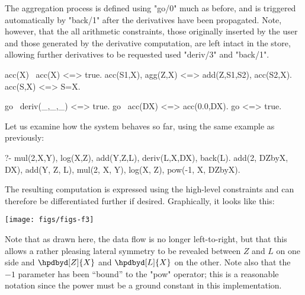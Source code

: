 The aggregation process is defined using "go/0" much as before, and is triggered
automatically by "back/1" after the derivatives have been propagated.
Note, however, that the all arithmetic constraints, those originally inserted
by the user and those generated by the derivative computation, are left
intact in the store, allowing further derivatives to be requested used "deriv/3"
and "back/1".
\begin{prolog-framed}[name=adtwo,firstnumber=36]
	acc(X) \ acc(X) <=> true.
	acc(S1,X), agg(Z,X) <=> add(Z,S1,S2), acc(S2,X).
	acc(S,X) <=> S=X.

	go \ deriv(_,_,_) <=> true.
	go \ acc(DX) <=> acc(0.0,DX).
	go <=> true.
\end{prolog-framed}
Let us examine how the system behaves so far, using the same
example as previously:
\begin{prolog-barred}
	?- mul(2,X,Y), log(X,Z), add(Y,Z,L), deriv(L,X,DX), back(L).
	add(2, DZbyX, DX),
	add(Y, Z, L),
	mul(2, X, Y),
	log(X, Z),
	pow(-1, X, DZbyX).
\end{prolog-barred}
The resulting computation is expressed using the high-level constraints
and can therefore be differentiated further if desired. Graphically, it 
looks like this:
\begin{center}
\texttt{[image: figs/figs-f3]}
\end{center}
Note that as drawn here, the data flow is no longer left-to-right, but that this
allows a rather pleasing lateral symmetry to be revealed between $Z$ and $L$ on one side and $\hpdbyd[Z]{X}$
and $\hpdbyd[L]{X}$ on the other. Note also that the $-1$ parameter has been ``bound'' to the 
"pow" operator; this is a reasonable notation since the power must be a ground constant 
in this implementation.

